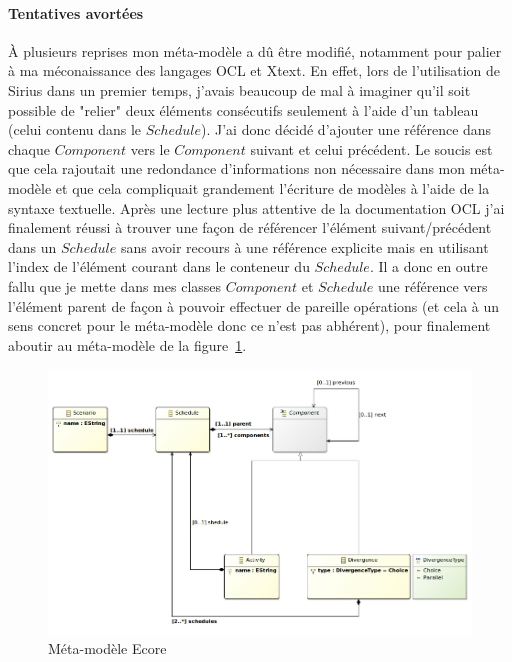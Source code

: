\documentclass[12pt]{article}
\begin{document}
\paragraph{Tentatives avortées}
À plusieurs reprises mon méta-modèle a dû être modifié, notamment pour palier à ma méconaissance des langages OCL et Xtext. En effet, lors de l'utilisation de Sirius dans un premier temps, j'avais beaucoup de mal à imaginer qu'il soit possible de "relier" deux éléments consécutifs seulement à l'aide d'un tableau (celui contenu dans le $Schedule$). J'ai donc décidé d'ajouter une référence dans chaque $Component$ vers le $Component$ suivant et celui précédent. Le soucis est que cela rajoutait une redondance d'informations non nécessaire dans mon méta-modèle et que cela compliquait grandement l'écriture de modèles à l'aide de la syntaxe textuelle. Après une lecture plus attentive de la documentation OCL j'ai finalement réussi à trouver une façon de référencer l'élément suivant/précédent dans un $Schedule$ sans avoir recours à une référence explicite mais en utilisant l'index de l'élément courant dans le conteneur du $Schedule$. Il a donc en outre fallu que je mette dans mes classes $Component$ et $Schedule$ une référence vers l'élément parent de façon à pouvoir effectuer de pareille opérations (et cela à un sens concret pour le méta-modèle donc ce n'est pas abhérent), pour finalement aboutir au méta-modèle de la figure~\ref{Ecore}.

\begin{figure}
	\begin{center}
		\includegraphics[width=\textwidth]{figures/scenario.png}
		\caption{Méta-modèle Ecore}
		\label{Ecore}
	\end{center}
\end{figure}
\end{document}
